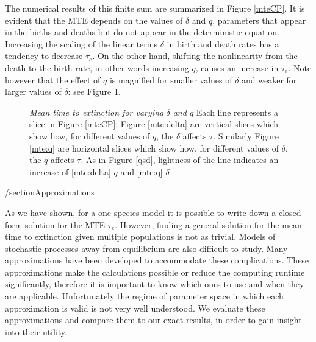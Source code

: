 \documentclass[a4paper,10pt]{article}
\numberwithin{equation}{section} %
\begin{document}
The numerical results of this finite sum are summarized in Figure \ref{mteCP}.
It is evident that the MTE depends on the values of $\delta$ and $q$, parameters that appear in the births and deaths but do not appear in the deterministic equation. 
Increasing the scaling of the linear terms $\delta$ in birth and death rates has a tendency to decrease $\tau_e$. 
On the other hand, shifting the nonlinearity from the death to the birth rate, in other words increasing $q$, causes an increase in $\tau_e$. 
Note however that the effect of $q$ is magnified for smaller values of $\delta$ and weaker for larger values of $\delta$: see Figure \ref{mte}. 

\begin{figure}[ht!]
  \centering
  \hfill
  \caption{\emph{Mean time to extinction for varying $\delta$ and $q$} Each line represents a slice in Figure \ref{mteCP}: Figure \ref{mte:delta} are vertical slices which show how, for different values of $q$, the $\delta$ affects $\tau$. Similarly Figure \ref{mte:q} are horizontal slices which show how, for different values of $\delta$, the $q$ affects $\tau$. As in Figure \ref{qsd}, lightness of the line indicates an increase of \ref{mte:delta} $q$ and \ref{mte:q} $\delta$}
  \label{mte}
\end{figure}














/section{Approximations}%

As we have shown, for a one-species model it is possible to write down a closed form solution for the MTE $\tau_e$.
However, finding a general solution for the mean time to extinction given multiple populations is not as trivial. 
Models of stochastic processes away from equilibrium are also difficult to study. 
Many approximations have been developed to accommodate these complications. 
These approximations make the calculations possible or reduce the computing runtime significantly, therefore it is important to know which ones to use and when they are applicable. 
Unfortunately the regime of parameter space in which each approximation is valid is not very well understood. 
We evaluate these approximations and compare them to our exact results, in order to gain insight into their utility. 
\iffalse
\end{document}
